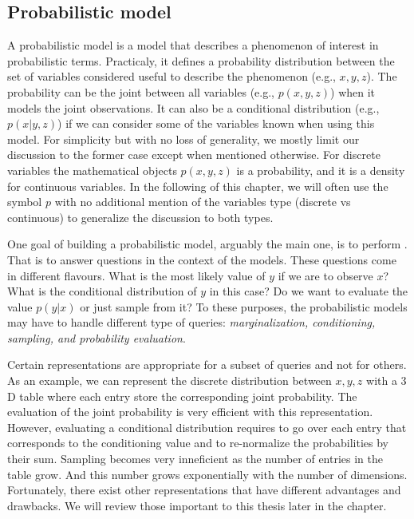 \subsection{Probabilistic model}
A probabilistic model is a model that describes a phenomenon of interest in probabilistic terms. Practicaly, it defines a probability distribution between the set of variables considered useful to describe the phenomenon (e.g., $x, y, z$). The probability can be the joint between all variables (e.g., $p(x, y, z)$) when it models the joint observations. It can also be a conditional distribution  (e.g., $p(x | y, z)$) if we can consider some of the variables known when using this model. For simplicity but with no loss of generality, we mostly limit our discussion to the former case except when mentioned otherwise. For discrete variables the mathematical objects $p(x, y, z)$ is a probability, and it is a density for continuous variables. In the following of this chapter, we will often use the symbol $p$ with no additional mention of the variables type (discrete vs continuous) to generalize the discussion to both types.

One goal of building a probabilistic model, arguably the main one, is to perform . That is to answer questions in the context of the models. These questions come in different flavours. What is the most likely value of $y$ if we are to observe $x$? What is the conditional distribution of $y$ in this case? Do we want to evaluate the value $p(y|x)$ or just sample from it? To these purposes, the probabilistic models may have to handle different type of queries: \textit{marginalization, conditioning, sampling, and probability evaluation}.

Certain representations are appropriate for a subset of queries and not for others. As an example, we can represent the discrete distribution between $x, y, z$ with a $3$D table where each entry store the corresponding joint probability. The evaluation of the joint probability is very efficient with this representation. However, evaluating a conditional distribution requires to go over each entry that corresponds to the conditioning value and to re-normalize the probabilities by their sum. Sampling becomes very inneficient as the number of entries in the table grow. And this number grows exponentially with the number of dimensions. Fortunately, there exist other representations that have different advantages and drawbacks. We will review those important to this thesis later in the chapter.


